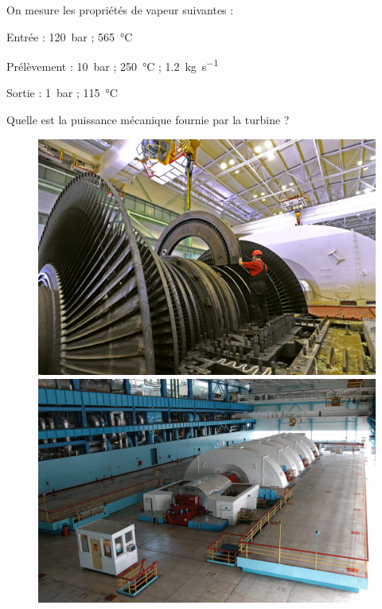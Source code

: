 	On mesure les propriétés de vapeur suivantes :
	
	\begin{description}
		\item Entrée : 		\SI{120}{\bar} ; 	\SI{565}{\degreeCelsius}
		\item Prélèvement : 	\SI{10}{\bar} ; 	\SI{250}{\degreeCelsius} ;	\SI{1,2}{\kilogram\per\second}
		\item Sortie : 		\SI{1}{\bar} ;		\SI{115}{\degreeCelsius}
	\end{description}

	Quelle est la puissance mécanique fournie par la turbine ?

	\begin{figure}
		\begin{center}
			\includegraphics[height=0.33\textwidth]{images/exercice_turbine_centrale2.jpg}
			\includegraphics[height=0.33\textwidth]{images/exercice_turbine_centrale1.jpg}
		\end{center}
		\label{fig_centrale_balakovo}
	\end{figure}

\exercisesolutionpage
\titreresultats
	\linktosolutionsblurb

